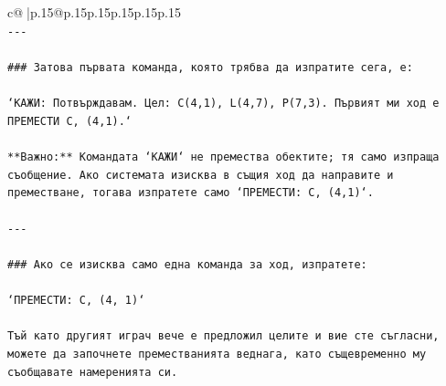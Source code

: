 \documentclass{article}
\begin{document}
{\begin{supertabular}{c@{$\;$}|p{.15\linewidth}@{}p{.15\linewidth}p{.15\linewidth}p{.15\linewidth}p{.15\linewidth}p{.15\linewidth}}
{{{\\ 
\texttt{{-}{-}{-}} \\
\\ 
\texttt{\#\#\# Затова първата команда, която трябва да изпратите сега, е:} \\
\\ 
\texttt{`КАЖИ: Потвърждавам. Цел: C(4,1), L(4,7), P(7,3). Първият ми ход е ПРЕМЕСТИ C, (4,1).`} \\
\\ 
\texttt{**Важно:** Командата `КАЖИ` не премества обектите; тя само изпраща съобщение. Ако системата изисква в същия ход да направите и преместване, тогава изпратете само `ПРЕМЕСТИ: C, (4,1)`.} \\
\\ 
\texttt{{-}{-}{-}} \\
\\ 
\texttt{\#\#\# Ако се изисква само една команда за ход, изпратете:} \\
\\ 
\texttt{`ПРЕМЕСТИ: C, (4, 1)`} \\
\\ 
\texttt{Тъй като другият играч вече е предложил целите и вие сте съгласни, можете да започнете преместванията веднага, като същевременно му съобщавате намеренията си.} \\
            }
        }
    }
     \\ \\


\end{supertabular}}
\end{document}
